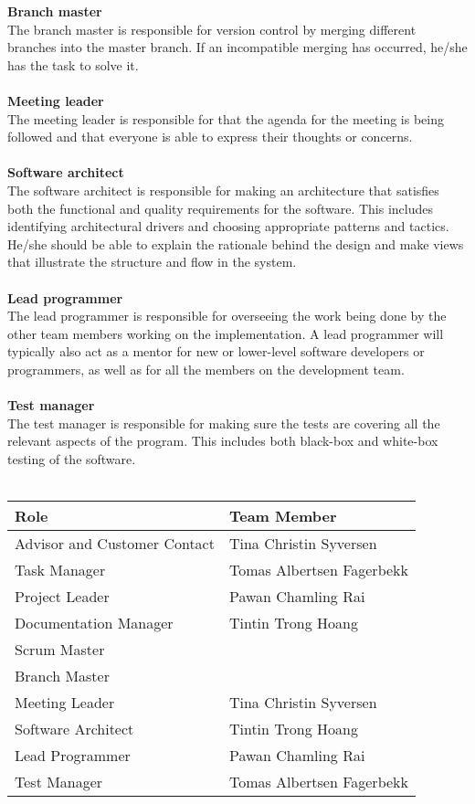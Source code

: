 \documentclass{report}
\begin{document}
\textbf{Branch master}\\
The branch master is responsible for version control by merging different branches into the master branch. If an incompatible merging has occurred, he/she has the task to solve it.\\ \\
\textbf{Meeting leader}\\
The meeting leader is responsible for that the agenda for the meeting is being followed and that everyone is able to express their thoughts or concerns.\\ \\
\textbf{Software architect}\\
The software architect is responsible for making an architecture that satisfies both the functional and quality requirements for the software. This includes identifying architectural drivers and choosing appropriate patterns and tactics. He/she should be able to explain the rationale behind the design and make views that illustrate the structure and flow in the system.\\ \\
\textbf{Lead programmer}\\
The lead programmer is responsible for overseeing the work being done by the other team members working on the implementation. A lead programmer will typically also act as a mentor for new or lower-level software developers or programmers, as well as for all the members on the development team.\\ \\
\textbf{Test manager}\\
The test manager is responsible for making sure the tests are covering all the relevant aspects of the program. This includes both black-box and white-box testing of the software.
\\ \\
\begin{tabular}{| l | p{6 cm} |} \hline
Role & Team Member \\ \hline
Advisor and Customer Contact & Tina Christin Syversen \\ \hline
Task Manager & Tomas Albertsen Fagerbekk \\ \hline
Project Leader & Pawan Chamling Rai \\ \hline
Documentation Manager & Tintin Trong Hoang \\ \hline
Scrum Master &   \\ \hline
Branch Master &   \\ \hline
Meeting Leader & Tina Christin Syversen  \\ \hline
Software Architect & Tintin Trong Hoang  \\ \hline
Lead Programmer & Pawan Chamling Rai  \\ \hline
Test Manager & Tomas Albertsen Fagerbekk  \\ \hline
\end{tabular}
\end{document}

